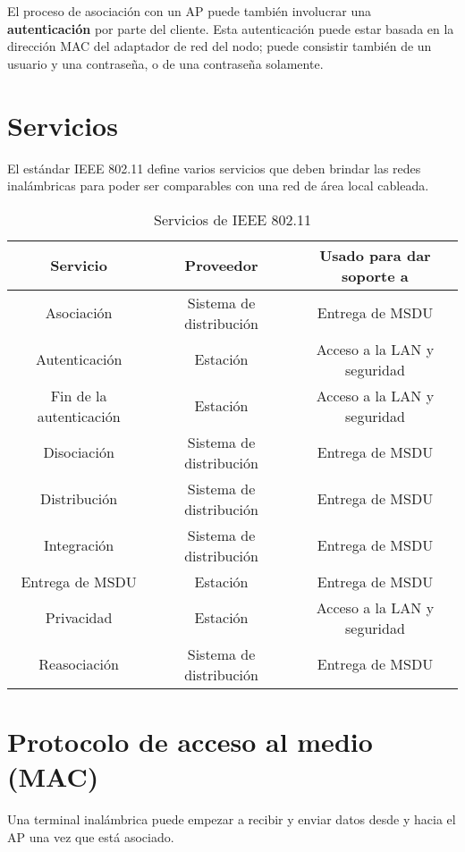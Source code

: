 El proceso de asociación con un AP puede también involucrar una \textbf{autenticación} por parte del cliente. Esta autenticación puede estar basada en la dirección MAC del adaptador de red del nodo; puede consistir también de un usuario y una contraseña, o de una contraseña solamente.

\section{Servicios}

El estándar IEEE 802.11 define varios servicios que deben brindar las redes inalámbricas para poder ser comparables con una red de área local cableada.

\begin{table}[h!]
\centering
\begin{tabular}{| c | c | c |}
\hline
\textbf{Servicio} & \textbf{Proveedor} & \textbf{Usado para dar soporte a} \\ \hline
\hline
Asociación & Sistema de distribución & Entrega de MSDU \\ \hline
Autenticación & Estación & Acceso a la LAN y seguridad \\ \hline
Fin de la autenticación & Estación & Acceso a la LAN y seguridad \\ \hline
Disociación & Sistema de distribución & Entrega de MSDU \\ \hline
Distribución & Sistema de distribución & Entrega de MSDU \\ \hline
Integración & Sistema de distribución & Entrega de MSDU \\ \hline
Entrega de MSDU & Estación & Entrega de MSDU \\ \hline
Privacidad & Estación & Acceso a la LAN y seguridad \\ \hline
Reasociación & Sistema de distribución & Entrega de MSDU \\ \hline
\end{tabular}
\caption{Servicios de IEEE 802.11 \autocite{Stallings:Wireless:SeptimaEd}}
\end{table}


\section{Protocolo de acceso al medio (MAC)}

Una terminal inalámbrica puede empezar a recibir y enviar datos desde y hacia el AP una vez que está asociado.


